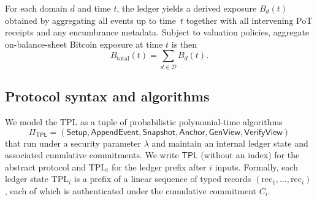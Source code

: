 \documentclass[11pt]{article}
\begin{document}
For each domain $d$ and time $t$, the ledger yields a derived exposure $B_d(t)$ obtained by aggregating all events up to time~$t$
together with all intervening PoT receipts and any encumbrance metadata.
Subject to valuation policies, aggregate on-balance-sheet Bitcoin exposure at time $t$ is then
\[
  B_{\mathrm{total}}(t) = \sum_{d \in \mathcal{D}} B_d(t).
\]

\subsection{Protocol syntax and algorithms}

We model the TPL as a tuple of probabilistic polynomial-time algorithms
\[
  \Pi_{\mathsf{TPL}} = (\mathsf{Setup}, \mathsf{AppendEvent}, \mathsf{Snapshot}, \mathsf{Anchor}, \mathsf{GenView}, \mathsf{VerifyView})
\]
that run under a security parameter $\lambda$ and maintain an internal ledger state and associated cumulative commitments.
We write $\mathsf{TPL}$ (without an index) for the abstract protocol and $\mathrm{TPL}_i$ for the ledger prefix after $i$ inputs.
Formally, each ledger state $\mathrm{TPL}_i$ is a prefix of a linear sequence of typed records $(\mathrm{rec}_1,\ldots,\mathrm{rec}_i)$, each of which is authenticated under the cumulative commitment $C_i$.
\end{document}
